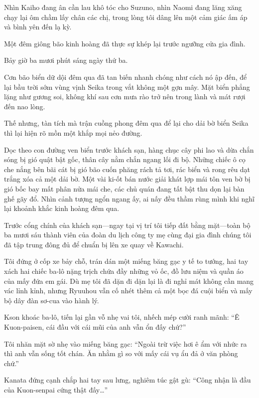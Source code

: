 \documentclass[../main.tex]{subfiles}
\begin{document}
Nhìn Kaiho đang ân cần lau khô tóc cho Suzuno, nhìn Naomi đang lăng xăng chạy lại ôm chầm lấy chân các chị, trong lòng tôi dâng lên một cảm giác ấm áp và bình yên đến lạ kỳ.

Một đêm giông bão kinh hoàng đã thực sự khép lại trước ngưỡng cửa gia đình.


Bảy giờ ba mươi phút sáng ngày thứ ba.

Cơn bão biển dữ dội đêm qua đã tan biến nhanh chóng như cách nó ập đến, để lại bầu trời sớm vùng vịnh Seika trong vắt không một gợn mây. Mặt biển phẳng lặng như gương soi, không khí sau cơn mưa rào trở nên trong lành và mát rượi đến nao lòng.

Thế nhưng, tàn tích mà trận cuồng phong đêm qua để lại cho dải bờ biển Seika thì lại hiện rõ mồn một khắp mọi nẻo đường.

Dọc theo con đường ven biển trước khách sạn, hàng chục cây phi lao và dừa chắn sóng bị gió quật bật gốc, thân cây nằm chắn ngang lối đi bộ. Những chiếc ô cọ che nắng bên bãi cát bị gió bão cuốn phăng rách tả tơi, rác biển và rong rêu dạt trắng xóa cả một dải bờ. Một vài ki-ốt bán nước giải khát lợp mái tôn ven bờ bị gió bốc bay mất phân nửa mái che, các chủ quán đang tất bật thu dọn lại bàn ghế gãy đổ. Nhìn cảnh tượng ngổn ngang ấy, ai nấy đều thầm rùng mình khi nghĩ lại khoảnh khắc kinh hoàng đêm qua.

Trước cổng chính của khách sạn—ngay tại vị trí tôi tiếp đất bằng mặt—toàn bộ ba mươi sáu thành viên của đoàn du lịch công ty mẹ cùng đại gia đình chúng tôi đã tập trung đông đủ để chuẩn bị lên xe quay về Kawachi.

Tôi đứng ở cốp xe bảy chỗ, trán dán một miếng băng gạc y tế to tướng, hai tay xách hai chiếc ba-lô nặng trịch chứa đầy những vỏ ốc, đồ lưu niệm và quần áo của mấy đứa em gái. Dù mẹ tôi đã dặn đi dặn lại là đi nghỉ mát không cần mang vác lỉnh kỉnh, nhưng Ryuuhou vẫn cố nhét thêm cả một bọc đá cuội biển và mấy bộ dây đàn sơ-cua vào hành lý.

Kson khoác ba-lô, tiến lại gần vỗ nhẹ vai tôi, nhếch mép cười ranh mãnh: ``Ê Kuon-paisen, cái đầu với cái mũi của anh vẫn ổn đấy chứ?''

Tôi nhăn mặt sờ nhẹ vào miếng băng gạc: ``Ngoài trừ việc hơi ê ẩm với nhức ra thì anh vẫn sống tốt chán. Ăn nhằm gì so với mấy cái vụ ẩu đả ở văn phòng chứ.''

Kanata đứng cạnh chắp hai tay sau lưng, nghiêm túc gật gù: ``Công nhận là đầu của Kuon-senpai cứng thật đấy\dots''
\end{document}
